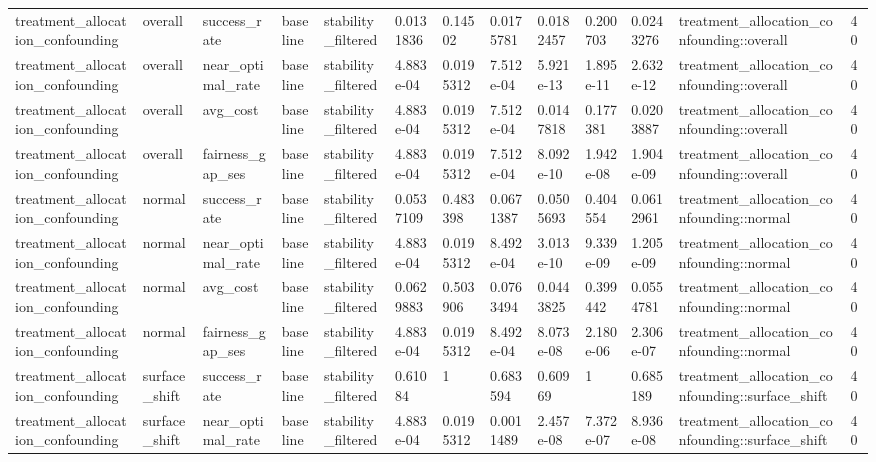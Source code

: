 \begin{tabular}{lllllllllllll}
treatment\_allocation\_confounding & overall & success\_rate & baseline & stability\_filtered & 0.0131836 & 0.14502 & 0.0175781 & 0.0182457 & 0.200703 & 0.0243276 & treatment\_allocation\_confounding::overall & 40 \\
treatment\_allocation\_confounding & overall & near\_optimal\_rate & baseline & stability\_filtered & 4.883e-04 & 0.0195312 & 7.512e-04 & 5.921e-13 & 1.895e-11 & 2.632e-12 & treatment\_allocation\_confounding::overall & 40 \\
treatment\_allocation\_confounding & overall & avg\_cost & baseline & stability\_filtered & 4.883e-04 & 0.0195312 & 7.512e-04 & 0.0147818 & 0.177381 & 0.0203887 & treatment\_allocation\_confounding::overall & 40 \\
treatment\_allocation\_confounding & overall & fairness\_gap\_ses & baseline & stability\_filtered & 4.883e-04 & 0.0195312 & 7.512e-04 & 8.092e-10 & 1.942e-08 & 1.904e-09 & treatment\_allocation\_confounding::overall & 40 \\
treatment\_allocation\_confounding & normal & success\_rate & baseline & stability\_filtered & 0.0537109 & 0.483398 & 0.0671387 & 0.0505693 & 0.404554 & 0.0612961 & treatment\_allocation\_confounding::normal & 40 \\
treatment\_allocation\_confounding & normal & near\_optimal\_rate & baseline & stability\_filtered & 4.883e-04 & 0.0195312 & 8.492e-04 & 3.013e-10 & 9.339e-09 & 1.205e-09 & treatment\_allocation\_confounding::normal & 40 \\
treatment\_allocation\_confounding & normal & avg\_cost & baseline & stability\_filtered & 0.0629883 & 0.503906 & 0.0763494 & 0.0443825 & 0.399442 & 0.0554781 & treatment\_allocation\_confounding::normal & 40 \\
treatment\_allocation\_confounding & normal & fairness\_gap\_ses & baseline & stability\_filtered & 4.883e-04 & 0.0195312 & 8.492e-04 & 8.073e-08 & 2.180e-06 & 2.306e-07 & treatment\_allocation\_confounding::normal & 40 \\
treatment\_allocation\_confounding & surface\_shift & success\_rate & baseline & stability\_filtered & 0.61084 & 1 & 0.683594 & 0.60969 & 1 & 0.685189 & treatment\_allocation\_confounding::surface\_shift & 40 \\
treatment\_allocation\_confounding & surface\_shift & near\_optimal\_rate & baseline & stability\_filtered & 4.883e-04 & 0.0195312 & 0.0011489 & 2.457e-08 & 7.372e-07 & 8.936e-08 & treatment\_allocation\_confounding::surface\_shift & 40 \\

\end{tabular}
